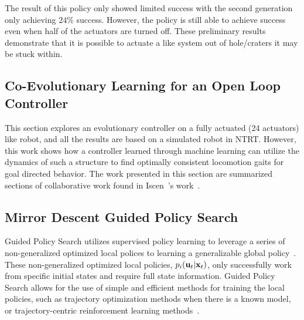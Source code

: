 The result of this policy only showed limited success with the second generation only achieving \(24\%\) success.
However, the policy is still able to achieve success even when half of the actuators are turned off.
These preliminary results demonstrate that it is possible to actuate a \SB{} like system out of hole/craters it may be stuck within.


\subsection{Co-Evolutionary Learning for an Open Loop Controller}
\label{sec:openLoopControl}
This section explores an evolutionary controller on a fully actuated (24 actuators) \SB{} like robot, and all the results are based on a simulated robot in NTRT.
However, this work shows how a controller learned through machine learning can utilize the dynamics of such a structure to find optimally consistent locomotion gaits for goal directed behavior.
The work presented in this section are summarized sections of collaborative work found in Iscen~\etal's work~\cite{iscen2015learning}.



\subsection{Mirror Descent Guided Policy Search}
\label{sec:mdgps}

Guided Policy Search utilizes supervised policy learning to leverage a series of non-generalized optimized local polices to learning a generalizable global policy~\cite{lk-gps-13}.
These non-generalized optimized local policies, $p_i(\mathbf{u}_t|\mathbf{x}_t)$, only successfully work from specific initial states and require full state information.
Guided Policy Search allows for the use of simple and efficient methods for training the local policies,
such as trajectory optimization methods when there is a known model, or
trajectory-centric reinforcement learning methods~\cite{la-lnnpg-14}.

